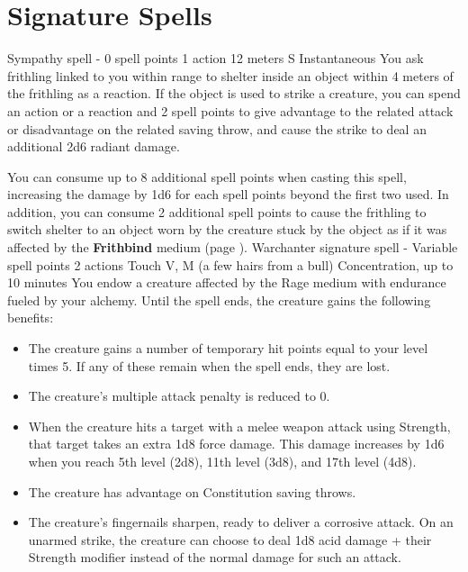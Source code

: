 \section{Signature Spells} \label{sec::signaturespells}
    {Sympathy spell - 0 spell points}
    {1 action}
    {12 meters}
    {S}
    {Instantaneous}
    You ask frithling linked to you within range to shelter inside an object within 4 meters of the frithling as a reaction.
    If the object is used to strike a creature, you can spend an action or a reaction and 2 spell points to give advantage to the related attack or disadvantage on the related saving throw, and cause the strike to deal an additional 2d6 radiant damage.

    You can consume up to 8 additional spell points when casting this spell, increasing the damage by 1d6 for each spell points beyond the first two used.
    In addition, you can consume 2 additional spell points to cause the frithling to switch shelter to an object worn by the creature stuck by the object as if it was affected by the \textbf{Frithbind} medium (page \pageref{medium::frithbind}).
    {Warchanter signature spell - Variable spell points}
    {2 actions}
    {Touch}
    {V, M (a few hairs from a bull)}
    {Concentration, up to 10 minutes}
    You endow a creature affected by the Rage medium with endurance fueled by your alchemy.
    Until the spell ends, the creature gains the following benefits:

    \begin{itemize}
        \item The creature gains a number of temporary hit points equal to your level times 5.
        If any of these remain when the spell ends, they are lost.
        \item The creature's multiple attack penalty is reduced to 0.
        \item When the creature hits a target with a melee weapon attack using Strength, that target takes an extra 1d8 force damage.
        This damage increases by 1d6 when you reach 5th level (2d8), 11th level (3d8), and 17th level (4d8).
        \item The creature has advantage on Constitution saving throws.
        \item The creature's fingernails sharpen, ready to deliver a corrosive attack.
        On an unarmed strike, the creature can choose to deal 1d8 acid damage + their Strength modifier instead of the normal damage for such an attack.
    \end{itemize}

